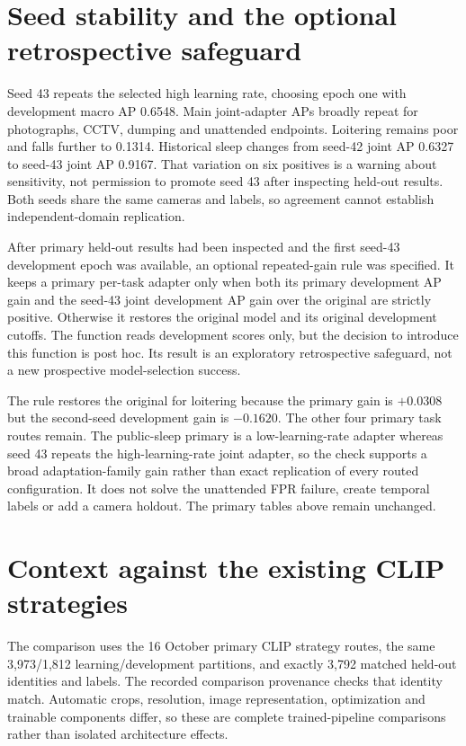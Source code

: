 \section{Seed stability and the optional retrospective safeguard}

Seed 43 repeats the selected high learning rate, choosing epoch one with development macro AP 0.6548. Main joint-adapter APs broadly repeat for photographs, CCTV, dumping and unattended endpoints. Loitering remains poor and falls further to 0.1314. Historical sleep changes from seed-42 joint AP 0.6327 to seed-43 joint AP 0.9167. That variation on six positives is a warning about sensitivity, not permission to promote seed 43 after inspecting held-out results. Both seeds share the same cameras and labels, so agreement cannot establish independent-domain replication.

After primary held-out results had been inspected and the first seed-43 development epoch was available, an optional repeated-gain rule was specified. It keeps a primary per-task adapter only when both its primary development AP gain and the seed-43 joint development AP gain over the original are strictly positive. Otherwise it restores the original model and its original development cutoffs. The function reads development scores only, but the decision to introduce this function is post hoc. Its result is an exploratory retrospective safeguard, not a new prospective model-selection success.


The rule restores the original for loitering because the primary gain is $+0.0308$ but the second-seed development gain is $-0.1620$. The other four primary task routes remain. The public-sleep primary is a low-learning-rate adapter whereas seed 43 repeats the high-learning-rate joint adapter, so the check supports a broad adaptation-family gain rather than exact replication of every routed configuration. It does not solve the unattended FPR failure, create temporal labels or add a camera holdout. The primary tables above remain unchanged.


\section{Context against the existing CLIP strategies}

The comparison uses the 16 October primary CLIP strategy routes, the same 3,973/1,812 learning/development partitions, and exactly 3,792 matched held-out identities and labels. The recorded comparison provenance checks that identity match. Automatic crops, resolution, image representation, optimization and trainable components differ, so these are complete trained-pipeline comparisons rather than isolated architecture effects.


